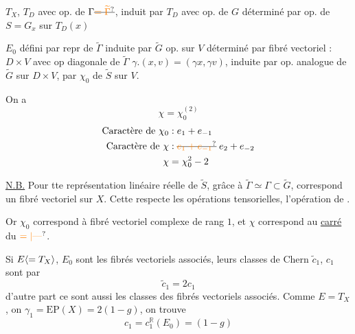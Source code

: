 
$T_X$, $T_D$ avec op. de $\Gamma\deleted{\unsure{=\widetilde\Gamma}}$, induit par $T_D$ avec op. de $G$ déterminé par op. de $S=G_x$ sur $T_D(x)$


$E_0$ défini par repr de $\widetilde\Gamma$ induite par $\widetilde G$ op. sur $V$ déterminé par fibré vectoriel  : $D\times V$ avec op diagonale de $\widetilde\Gamma$ $\gamma.(x,v)=(\gamma x,\gamma v)$, induite par op. analogue de $\widetilde G$ sur $D\times V$,  par   $\chi_0$ de $\widetilde S$ sur $V$.

On a
\[
\boxed{\chi=\chi_0^{(2)}}
\]
\[
\begin{aligned}
\text{Caractère de }\chi_0 &: e_1+e_{-1}\\
\text{Caractère de }\chi &: \deleted{\unsure{e_1+e_{-1}}}\;e_2+e_{-2}\\
\chi&=\chi_0^2-2
\end{aligned}
\]

 \uline{N.B.} Pour tte  représentation linéaire réelle  de $\widetilde S$, grâce à $\widetilde\Gamma\simeq\Gamma\subset\widetilde G$, correspond un fibré vectoriel  sur $X$. Cette 
respecte les opérations tensorielles, l'opération de .

Or $\chi_0$ correspond à  fibré vectoriel complexe de rang $1$, et $\chi$ correspond au \uline{carré} du $\unsure{=|\text{---}}$.

 Si $E\inserted{=T_X}$, $E_0$ sont les fibrés vectoriels  associés, leurs classes de Chern  $\widetilde c_1$, $c_1$ sont  par
\[
\widetilde c_1=2c_1
\]
d'autre part ce sont aussi les classes  des fibrés vectoriels associés. Comme  $E=T_X$, on  $\gamma_1=\mathrm{EP}(X)=2(1-g)$, on trouve
\[
c_1=c_1^{\mathbb R}(E_0)=(1-g)
\]

